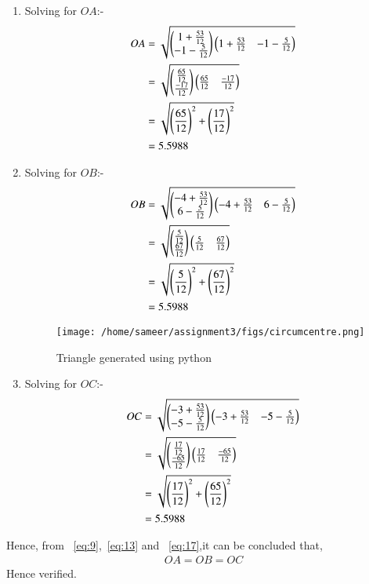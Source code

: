 \documentclass[journal,12pt,twocolumn]{IEEEtran}
\theoremstyle{remark}
\begin{document}
\begin{enumerate}
\item Solving for $OA$:-
\begin{align}
OA&=\sqrt{\myvec{1+\frac{53}{12}\\-1-\frac{5}{12}}\myvec{1+\frac{53}{12} & -1-\frac{5}{12}}}\\
&=\sqrt{\myvec{\frac{65}{12} \\ \frac{-17}{12}} \myvec{\frac{65}{12} & \frac{-17}{12}}}\\
&=\sqrt{\brak{\frac{65}{12}}^2 + \brak{\frac{17}{12}}^2}\\
&=5.5988 \label{eq:9}
\end{align}
\item Solving for $OB$:-
\begin{align}
OB&=\sqrt{\myvec{-4+\frac{53}{12}\\6-\frac{5}{12}}\myvec{-4+\frac{53}{12} & 6-\frac{5}{12}}}\\
&=\sqrt{\myvec{\frac{5}{12} \\ \frac{67}{12}} \myvec{\frac{5}{12} & \frac{67}{12}}}\\
&=\sqrt{\brak{\frac{5}{12}}^2 + \brak{\frac{67}{12}}^2}\\
&=5.5988 \label{eq:13}
\end{align}
\begin{figure}
\centering
\texttt{[image: /home/sameer/assignment3/figs/circumcentre.png]}
\caption{Triangle generated using python}
\label{fig: perpendicular bisector}
\end{figure}
\item Solving for $OC$:-
\begin{align}
OC&=\sqrt{\myvec{-3+\frac{53}{12}\\-5-\frac{5}{12}}\myvec{-3+\frac{53}{12} & -5-\frac{5}{12}}}\\
&=\sqrt{\myvec{\frac{17}{12} \\ \frac{-65}{12}} \myvec{\frac{17}{12} & \frac{-65}{12}}}\\
&=\sqrt{\brak{\frac{17}{12}}^2 + \brak{\frac{65}{12}}^2}\\
&=5.5988 \label{eq:17}
\end{align}
\end{enumerate}
Hence, from  ~\eqref{eq:9},~\eqref{eq:13} and ~\eqref{eq:17},it can be concluded that,
\begin{align}
OA=OB=OC
\end{align}
Hence verified.
\end{document}
